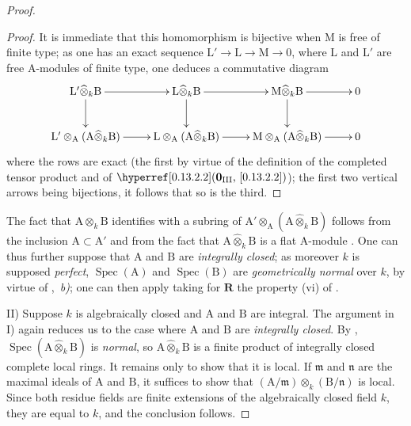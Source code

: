\begin{proof}
\begin{proof}

It is immediate that this homomorphism is bijective when $\mathrm{M}$ is free of finite type; as one has an exact sequence $\mathrm{L}'\to\mathrm{L}\to\mathrm{M}\to 0$, where $\mathrm{L}$ and $\mathrm{L}'$ are free $\mathrm{A}$-modules of finite type, one deduces a commutative diagram
\[
  \xymatrix{
    \mathrm{L}'\widehat{\otimes}_k\mathrm{B} \ar[r] \ar[d] & \mathrm{L}\widehat{\otimes}_k\mathrm{B} \ar[r] \ar[d] & \mathrm{M}\widehat{\otimes}_k\mathrm{B} \ar[r] \ar[d] & 0 \\
    \mathrm{L}'\otimes_\mathrm{A}(\mathrm{A}\widehat{\otimes}_k\mathrm{B}) \ar[r] & \mathrm{L}\otimes_\mathrm{A}(\mathrm{A}\widehat{\otimes}_k\mathrm{B}) \ar[r] & \mathrm{M}\otimes_\mathrm{A}(\mathrm{A}\widehat{\otimes}_k\mathrm{B}) \ar[r] & 0
  }
\]
where the rows are exact (the first by virtue of the definition of the completed tensor product and of $\sref[0\textsubscript{\mdseries III}]{0.13.2.2}$); the first two vertical arrows being bijections, it follows that so is the third.
\end{proof}

The fact that $\mathrm{A}\widehat{\otimes}_k\mathrm{B}$ identifies with a subring of $\mathrm{A}'\otimes_\mathrm{A}(\mathrm{A}\widehat{\otimes}_k\mathrm{B})$ follows from the inclusion $\mathrm{A}\subset\mathrm{A}'$ and from the fact that $\mathrm{A}\widehat{\otimes}_k\mathrm{B}$ is a flat $\mathrm{A}$-module . One can thus further suppose that $\mathrm{A}$ and $\mathrm{B}$ are \emph{integrally closed}; as moreover $k$ is supposed \emph{perfect}, $\operatorname{Spec}(\mathrm{A})$ and $\operatorname{Spec}(\mathrm{B})$ are \emph{geometrically normal} over $k$, by virtue of ,~\emph{b)}; one can then apply  taking for $\boldsymbol{R}$ the property (vi) of .

II) Suppose $k$ is algebraically closed and $\mathrm{A}$ and $\mathrm{B}$ are integral. The argument in I) again reduces us to the case where $\mathrm{A}$ and $\mathrm{B}$ are \emph{integrally closed}. By , $\operatorname{Spec}(\mathrm{A}\widehat{\otimes}_k\mathrm{B})$ is \emph{normal}, so $\mathrm{A}\widehat{\otimes}_k\mathrm{B}$ is a finite product of integrally closed complete local rings. It remains only to show that it is local. If $\mathfrak{m}$ and $\mathfrak{n}$ are the maximal ideals of $\mathrm{A}$ and $\mathrm{B}$, it suffices to show that $(\mathrm{A}/\mathfrak{m})\otimes_k(\mathrm{B}/\mathfrak{n})$ is local. Since both residue fields are finite extensions of the algebraically closed field $k$, they are equal to $k$, and the conclusion follows.
\end{proof}

